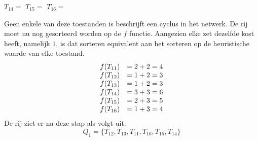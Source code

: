 \documentclass[alternative-exam.tex]{subfiles}
\begin{document}
\begin{center}
$T_{14} = $
$T_{15} = $
$T_{16} = $
\end{center}
Geen enkele van deze toestanden is beschrijft een cyclus in het netwerk. De rij moet nu nog gesorteerd worden op de $f$ functie. Aangezien elke zet dezelfde kost heeft, namelijk $1$, is dat sorteren equivalent aan het sorteren op de heuristische waarde van elke toestand.
\[
\begin{array}{c c}
f(T_{11}) &= 2 + 2 = 4\\
f(T_{12}) &= 1 + 2 = 3\\
f(T_{13}) &= 1 + 2 = 3\\
f(T_{14}) &= 3 + 3 = 6\\
f(T_{15}) &= 2 + 3 = 5\\
f(T_{16}) &= 1 + 3 = 4\\
\end{array}
\]
De rij ziet er na deze stap als volgt uit.
\[
Q_1 = \{T_{12}, T_{13}, T_{11}, T_{16}, T_{15}, T_{14}\}
\]
\end{document}
